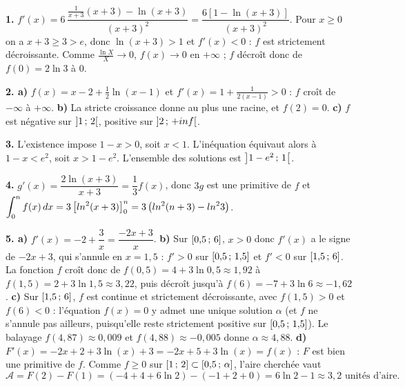 \begin{corrige}[annales]
\textbf{1.} $f'(x) = 6\,\dfrac{\frac{1}{x+3}(x+3)-\ln(x+3)}{(x+3)^{2}}
= \dfrac{6\left[1-\ln(x+3)\right]}{(x+3)^{2}}$. Pour $x \geq 0$ on a
$x+3 \geq 3 > e$, donc $\ln(x+3)>1$ et $f'(x)<0$ : $f$ est strictement
décroissante. Comme $\frac{\ln X}{X}\to0$, $f(x)\to0$ en $+\infty$ ; $f$
décroît donc de $f(0) = 2\ln3$ à $0$.

\textbf{2. a)} $f(x) = x-2+\frac12\ln(x-1)$ et
$f'(x) = 1+\frac{1}{2(x-1)}>0$ : $f$ croît de $-\infty$ à $+\infty$.
\textbf{b)} La stricte croissance donne au plus une racine, et $f(2) = 0$.
\textbf{c)} $f$ est négative sur $\left]1\,;\,2\right[$, positive sur
$\left]2\,;\,+inf\right[$.

\textbf{3.} L'existence impose $1-x>0$, soit $x<1$. L'inéquation équivaut
alors à $1-x<e^{2}$, soit $x>1-e^{2}$. L'ensemble des solutions est
$\left]1-e^{2}\,;\,1\right[$.

\textbf{4.} $g'(x) = \dfrac{2\ln(x+3)}{x+3} = \dfrac13 f(x)$, donc $3g$ est une
primitive de $f$ et
$\displaystyle\int_{0}^{n}f(x)\,dx = 3\left[ln^{2}(x+3)\right]_{0}^{n}
= 3\left(ln^{2}(n+3)-ln^{2}3\right)$.

\textbf{5. a)} $f'(x) = -2+\dfrac3x = \dfrac{-2x+3}{x}$.
\textbf{b)} Sur $\left[0{,}5\,;\,6\right]$, $x>0$ donc $f'(x)$ a le signe de
$-2x+3$, qui s'annule en $x = 1{,}5$ : $f'>0$ sur $\left[0{,}5\,;\,1{,}5\right]$
et $f'<0$ sur $\left[1{,}5\,;\,6\right]$. La fonction $f$ croît donc de
$f(0{,}5) = 4+3\ln0{,}5 \approx 1{,}92$ à $f(1{,}5) = 2+3\ln1{,}5 \approx
3{,}22$, puis décroît jusqu'à $f(6) = -7+3\ln6 \approx -1{,}62$.
\textbf{c)} Sur $\left[1{,}5\,;\,6\right]$, $f$ est continue et strictement
décroissante, avec $f(1{,}5)>0$ et $f(6)<0$ : l'équation $f(x) = 0$ y admet
une unique solution $\alpha$ (et $f$ ne s'annule pas ailleurs, puisqu'elle
reste strictement positive sur $\left[0{,}5\,;\,1{,}5\right]$). Le balayage
$f(4{,}87) \approx 0{,}009$ et $f(4{,}88) \approx -0{,}005$ donne
$\alpha \approx 4{,}88$.
\textbf{d)} $F'(x) = -2x+2+3\ln(x)+3 = -2x+5+3\ln(x) = f(x)$ : $F$ est bien
une primitive de $f$. Comme $f\geq0$ sur $\left[1\,;\,2\right]\subset
\left[0{,}5\,;\,\alpha\right]$, l'aire cherchée vaut
\[
  \mathcal{A} = F(2)-F(1) = \left(-4+4+6\ln2\right)-\left(-1+2+0\right)
  = 6\ln2-1 \approx 3{,}2 \text{ unités d'aire.}
\]
\end{corrige}

